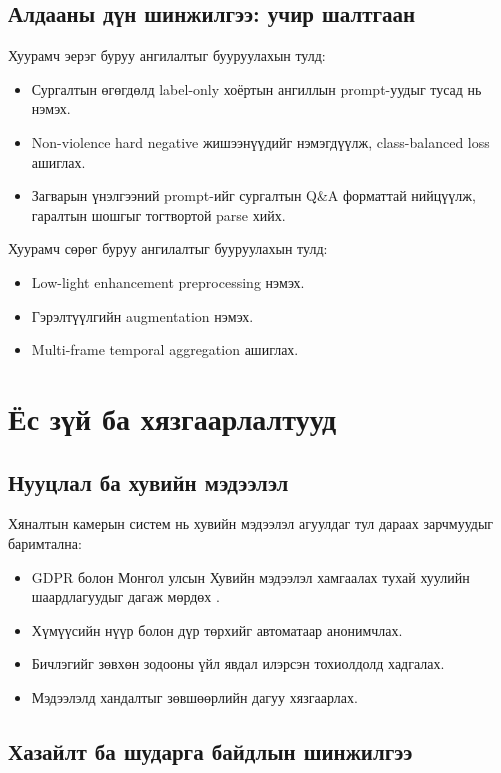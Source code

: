 \subsection{Алдааны дүн шинжилгээ: учир шалтгаан}

Хуурамч эерэг буруу ангилалтыг бууруулахын тулд:
\begin{itemize}
    \item Сургалтын өгөгдөлд label-only хоёртын ангиллын prompt-уудыг тусад нь нэмэх.
    \item Non-violence hard negative жишээнүүдийг нэмэгдүүлж, class-balanced loss ашиглах.
    \item Загварын үнэлгээний prompt-ийг сургалтын Q\&A форматтай нийцүүлж, гаралтын шошгыг тогтвортой parse хийх.
\end{itemize}

Хуурамч сөрөг буруу ангилалтыг бууруулахын тулд:
\begin{itemize}
    \item Low-light enhancement preprocessing нэмэх.
    \item Гэрэлтүүлгийн augmentation нэмэх.
    \item Multi-frame temporal aggregation ашиглах.
\end{itemize}

\section{Ёс зүй ба хязгаарлалтууд}

\subsection{Нууцлал ба хувийн мэдээлэл}

Хяналтын камерын систем нь хувийн мэдээлэл агуулдаг тул дараах зарчмуудыг баримтална:

\begin{itemize}
    \item GDPR болон Монгол улсын Хувийн мэдээлэл хамгаалах тухай хуулийн шаардлагуудыг дагаж мөрдөх \cite{gdpr2016}.
    \item Хүмүүсийн нүүр болон дүр төрхийг автоматаар анонимчлах.
    \item Бичлэгийг зөвхөн зодооны үйл явдал илэрсэн тохиолдолд хадгалах.
    \item Мэдээлэлд хандалтыг зөвшөөрлийн дагуу хязгаарлах.
\end{itemize}

\subsection{Хазайлт ба шударга байдлын шинжилгээ}

